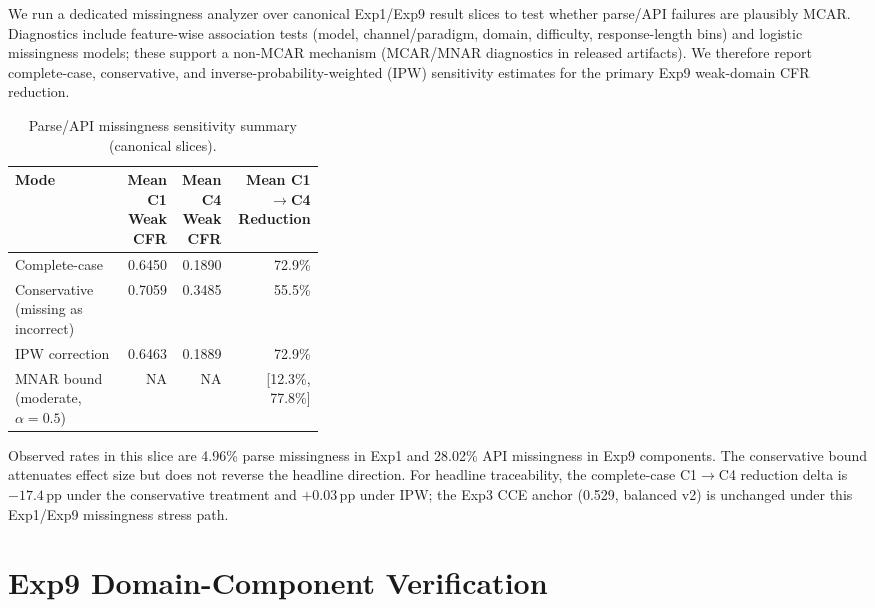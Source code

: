 \documentclass[10pt]{article}
\begin{document}
We run a dedicated missingness analyzer over canonical Exp1/Exp9 result slices to
test whether parse/API failures are plausibly MCAR. Diagnostics include feature-wise
association tests (model, channel/paradigm, domain, difficulty, response-length bins)
and logistic missingness models; these support a non-MCAR mechanism (MCAR/MNAR
diagnostics in released artifacts). We therefore report complete-case, conservative,
and inverse-probability-weighted (IPW) sensitivity estimates for the primary Exp9
weak-domain CFR reduction.

\begin{table}[h]
\centering
\caption{Parse/API missingness sensitivity summary (canonical slices).}
\label{tab:missingness}
\small
\begin{tabular}{>{\raggedright\arraybackslash}p{0.36\linewidth}rrr}
\toprule
Mode & \shortstack{Mean C1\\Weak CFR} & \shortstack{Mean C4\\Weak CFR} & \shortstack{Mean C1$\rightarrow$C4\\Reduction} \\
\midrule
Complete-case & 0.6450 & 0.1890 & 72.9\% \\
Conservative (missing as incorrect) & 0.7059 & 0.3485 & 55.5\% \\
IPW correction & 0.6463 & 0.1889 & 72.9\% \\
MNAR bound (moderate, $\alpha=0.5$) & NA & NA & [12.3\%, 77.8\%] \\
\bottomrule
\end{tabular}
\end{table}

Observed rates in this slice are 4.96\% parse missingness in Exp1 and 28.02\%
API missingness in Exp9 components. The conservative bound attenuates effect size
but does not reverse the headline direction. For headline traceability, the
complete-case C1$\rightarrow$C4 reduction delta is $-17.4$\,pp under the
conservative treatment and $+0.03$\,pp under IPW; the Exp3 CCE anchor
(0.529, balanced v2) is unchanged under this Exp1/Exp9 missingness stress path.

\section{Exp9 Domain-Component Verification}
\label{app:exp9-mapping-validity}
\end{document}
